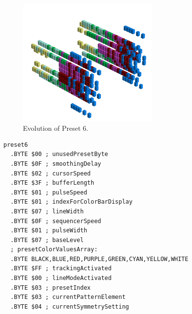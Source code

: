 \vspace*{-0.7cm}
\begin{minipage}[b]{0.48\linewidth}


                                                                 
\begin{figure}[H]                                                          
  \centering                                                             
  \begin{adjustbox}{width=7cm,center}                                   
  \includegraphics[width=7cm]{src/presets/pattern6-45.png}%
  \end{adjustbox}                                                        
\caption{Evolution of Preset 6.}                                           
\end{figure}                                                               
                                                                 
                                                                           
\end{minipage}
\hspace{0.1cm}
\begin{minipage}[b]{0.48\linewidth}                                       
\begin{lstlisting}[basicstyle=\ttfamily\scriptsize,caption=Data structure for Preset 6.]
preset6
  .BYTE $00 ; unusedPresetByte
  .BYTE $0F ; smoothingDelay
  .BYTE $02 ; cursorSpeed
  .BYTE $3F ; bufferLength
  .BYTE $01 ; pulseSpeed
  .BYTE $01 ; indexForColorBarDisplay
  .BYTE $07 ; lineWidth
  .BYTE $0F ; sequencerSpeed
  .BYTE $01 ; pulseWidth
  .BYTE $07 ; baseLevel
  ; presetColorValuesArray: 
  .BYTE BLACK,BLUE,RED,PURPLE,GREEN,CYAN,YELLOW,WHITE
  .BYTE $FF ; trackingActivated
  .BYTE $00 ; lineModeActivated
  .BYTE $03 ; presetIndex
  .BYTE $03 ; currentPatternElement
  .BYTE $04 ; currentSymmetrySetting
\end{lstlisting}
\end{minipage}

